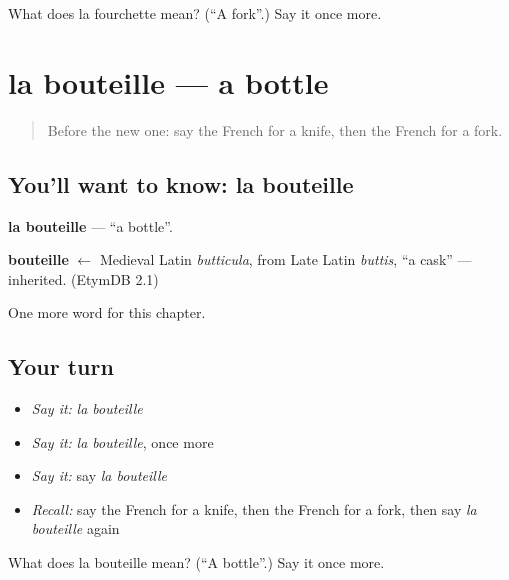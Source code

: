 \begin{tcolorbox}[breakable,colback=teal!4,colframe=teal!35!black,title={Before you move on}]
What does la fourchette mean? (\textquotedblleft{}A fork\textquotedblright{}.) Say it once more.
\end{tcolorbox}
\section[la bouteille]{la bouteille — a bottle}

\label{lesson:FR-C77-bouteille}



\begin{quote}
Before the new one: say the French for a knife, then the French for a fork.
\end{quote}

\subsection*{You'll want to know: la bouteille}
\textbf{la bouteille} — \textquotedblleft{}a bottle\textquotedblright{}.

\begin{cousinweb}
\textbf{bouteille} $\leftarrow$ Medieval Latin \emph{butticula}, from Late Latin \emph{buttis}, \textquotedblleft{}a cask\textquotedblright{} — inherited. (EtymDB 2.1)
\end{cousinweb}

\begin{grammarlens}[title={What you've built}]
One more word for this chapter.
\end{grammarlens}

\subsection*{Your turn}
\begin{itemize}
\raggedright
  \item \emph{Say it:} \emph{la bouteille}
  \item \emph{Say it:} \emph{la bouteille}, once more
  \item \emph{Say it:} say \emph{la bouteille}
  \item \emph{Recall:} say the French for a knife, then the French for a fork, then say \emph{la bouteille} again
\end{itemize}

\begin{tcolorbox}[breakable,colback=teal!4,colframe=teal!35!black,title={Before you move on}]
What does la bouteille mean? (\textquotedblleft{}A bottle\textquotedblright{}.) Say it once more.
\end{tcolorbox}
